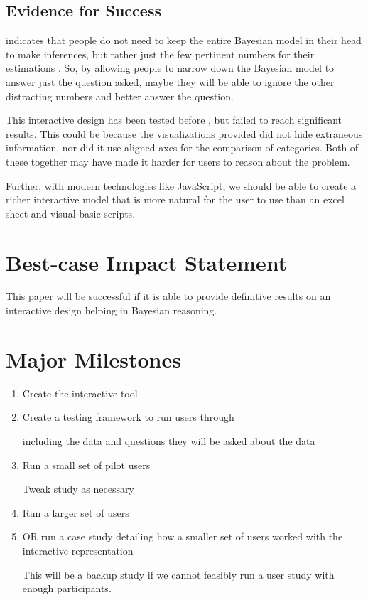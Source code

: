 \documentclass{proc}
\begin{document}
\subsection{Evidence for Success}

indicates that people do not need to keep the entire Bayesian model in their head to make inferences, but 
rather just the few pertinent numbers for their estimations \cite{Gigerenzer1995}. So, by allowing people
to narrow down the Bayesian model to answer just the question asked, maybe they will be able to ignore the other
distracting numbers and better answer the question. 

This interactive design has been tested before \cite{Tsai2011}, but failed to reach significant results.
This could be because the visualizations provided did not hide extraneous information, nor did it use aligned axes
for the comparison of categories. Both of these together may have made it harder for users to reason about the problem. 

Further, with modern technologies like JavaScript, we should be able to create a richer interactive model 
that is more natural for the user to use than an excel sheet and visual basic scripts. 


\section{Best-case Impact Statement}
This paper will be successful if it is able to provide definitive results on an interactive design helping in 
Bayesian reasoning. 

\section{Major Milestones}

\begin{enumerate}
    \item Create the interactive tool
    \item Create a testing framework to run users through

    including the data and questions they will be asked about the data

    \item Run a small set of pilot users

    Tweak study as necessary

    \item Run a larger set of users

    \item OR run a case study detailing how a smaller set of users worked with the interactive representation

    This will be a backup study if we cannot feasibly run a user study with enough participants. 
    
\end{enumerate}
\end{document}
